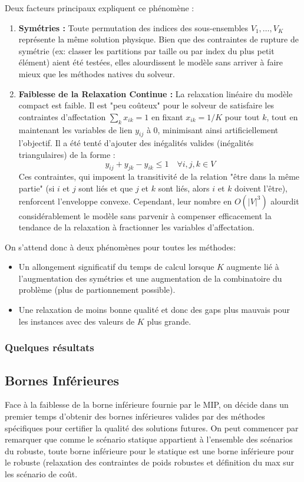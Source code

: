 \documentclass{article}
\begin{document}
Deux facteurs principaux expliquent ce phénomène :
\begin{enumerate}
    \item \textbf{Symétries :} Toute permutation des indices des sous-ensembles $V_1, \dots, V_K$ représente la même solution physique. Bien que des contraintes de rupture de symétrie (ex: classer les partitions par taille ou par index du plus petit élément) aient été testées, elles alourdissent le modèle sans arriver à faire mieux que les méthodes natives du solveur.
    \item \textbf{Faiblesse de la Relaxation Continue :} La relaxation linéaire du modèle compact est faible. Il est "peu coûteux" pour le solveur de satisfaire les contraintes d'affectation $\sum_k x_{ik} = 1$ en fixant $x_{ik} = 1/K$ pour tout $k$, tout en maintenant les variables de lien $y_{ij}$ à 0, minimisant ainsi artificiellement l'objectif.
    Il a été tenté d'ajouter des inégalités valides (inégalités triangulaires) de la forme :
    $$ y_{ij} + y_{jk} - y_{ik} \le 1 \quad \forall i,j,k \in V $$
    Ces contraintes, qui imposent la transitivité de la relation "être dans la même partie" (si $i$ et $j$ sont liés et que $j$ et $k$ sont liés, alors $i$ et $k$ doivent l'être), renforcent l'enveloppe convexe. Cependant, leur nombre en $O(|V|^3)$ alourdit considérablement le modèle sans parvenir à compenser efficacement la tendance de la relaxation à fractionner les variables d'affectation.
\end{enumerate}
On s'attend donc à deux phénomènes pour toutes les méthodes:
\begin{itemize}
    \item Un allongement significatif du temps de calcul lorsque $K$ augmente lié à l'augmentation des symétries et une augmentation de la combinatoire du problème (plus de partionnement possible).
    \item Une relaxation de moins bonne qualité et donc des gaps plus mauvais pour les instances avec des valeurs de $K$ plus grande.
\end{itemize}
\subsubsection*{Quelques résultats}

\subsection{Bornes Inférieures}

Face à la faiblesse de la borne inférieure fournie par le MIP, on décide dans un premier temps d'obtenir des bornes inférieures valides par des méthodes spécifiques pour certifier la qualité des solutions futures. On peut commencer par remarquer que comme le scénario statique appartient à l'ensemble des scénarios du robuste, toute borne inférieure pour le statique est une borne inférieure pour le robuste (relaxation des contraintes de poids robustes et définition du max sur les scénario de coût.
\end{document}

